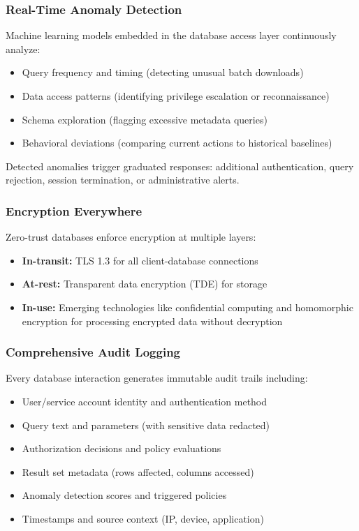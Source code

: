 \subsubsection{Real-Time Anomaly Detection}

Machine learning models embedded in the database access layer continuously analyze:

\begin{itemize}
    \item Query frequency and timing (detecting unusual batch downloads)
    \item Data access patterns (identifying privilege escalation or reconnaissance)
    \item Schema exploration (flagging excessive metadata queries)
    \item Behavioral deviations (comparing current actions to historical baselines)
\end{itemize}

Detected anomalies trigger graduated responses: additional authentication, query rejection, session termination, or administrative alerts.

\subsubsection{Encryption Everywhere}

Zero-trust databases enforce encryption at multiple layers:

\begin{itemize}
    \item \textbf{In-transit:} TLS 1.3 for all client-database connections
    \item \textbf{At-rest:} Transparent data encryption (TDE) for storage
    \item \textbf{In-use:} Emerging technologies like confidential computing and homomorphic encryption for processing encrypted data without decryption
\end{itemize}

\subsubsection{Comprehensive Audit Logging}

Every database interaction generates immutable audit trails including:

\begin{itemize}
    \item User/service account identity and authentication method
    \item Query text and parameters (with sensitive data redacted)
    \item Authorization decisions and policy evaluations
    \item Result set metadata (rows affected, columns accessed)
    \item Anomaly detection scores and triggered policies
    \item Timestamps and source context (IP, device, application)
\end{itemize}

